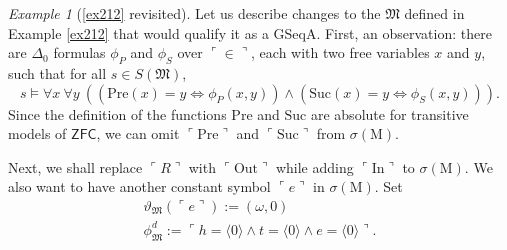 \documentclass[12pt, twoside]{memoir}
\numberwithin{equation}{section}
\theoremstyle{definition}
\theoremstyle{remark}
\newtheorem{ex}[thm]{Example}
\theoremstyle{definition}
\theoremstyle{definition}
\theoremstyle{definition}
\theoremstyle{remark}
\begin{document}
\begin{ex}[\ref{ex212} revisited]\label{ex228}
Let us describe changes to the $\mathfrak{M}$ defined in Example \ref{ex212} that would qualify it as a GSeqA. First, an observation: there are $\Delta_0$ formulas $\phi_P$ and $\phi_S$ over $\ulcorner \in \urcorner$, each with two free variables $x$ and $y$, such that for all $s \in S(\mathfrak{M})$,
\begin{equation*}
    s \models \forall x \ \forall y \ ((\mathrm{Pre}(x) = y \iff \phi_P(x, y)) \wedge (\mathrm{Suc}(x) = y \iff \phi_S(x, y))) \text{.}
\end{equation*}
Since the definition of the functions $\mathrm{Pre}$ and $\mathrm{Suc}$ are absolute for transitive models of $\mathsf{ZFC}$, we can omit $\ulcorner \mathrm{Pre} \urcorner$ and $\ulcorner \mathrm{Suc} \urcorner$ from $\sigma(\mathrm{M})$.

Next, we shall replace $\ulcorner R \urcorner$ with $\ulcorner \mathrm{Out} \urcorner$ while adding $\ulcorner \mathrm{In} \urcorner$ to $\sigma(\mathrm{M})$. We also want to have another constant symbol $\ulcorner e \urcorner$ in $\sigma(\mathrm{M})$. Set 
\begin{gather*}
    \vartheta_{\mathfrak{M}}(\ulcorner e \urcorner) := (\omega, 0) \\
    \phi^d_{\mathfrak{M}} := \ulcorner h = \langle 0 \rangle \wedge t = \langle 0 \rangle \wedge e = \langle 0 \rangle \urcorner \text{.}
\end{gather*}


\end{ex}
\end{document}
